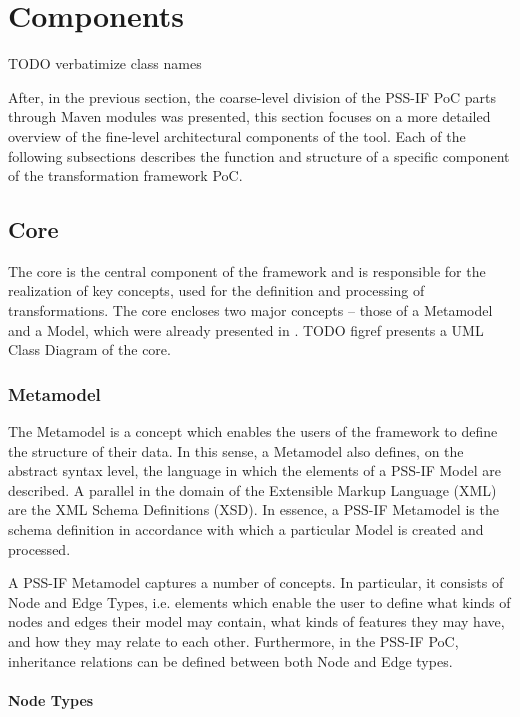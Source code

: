 \section{Components}
\label{sec:impl:components}

\color{red} TODO verbatimize class names \color{black}

After, in the previous section, the coarse-level division of the PSS-IF PoC parts through Maven modules was presented, this section focuses on a more detailed overview of the fine-level architectural components of the tool. Each of the following subsections describes the function and structure of a specific component of the transformation framework PoC.

\subsection{Core}

The core is the central component of the framework and is responsible for the realization of key concepts, used for the definition and processing of transformations. The core encloses two major concepts -- those of a Metamodel and a Model, which were already presented in . \color{red}TODO figref\color{black} presents a UML Class Diagram of the core.

\subsubsection{Metamodel}

The Metamodel is a concept which enables the users of the framework to define the structure of their data. In this sense, a Metamodel also defines, on the abstract syntax level, the language in which the elements of a PSS-IF Model are described. A parallel in the domain of the Extensible Markup Language (XML) are the XML Schema Definitions (XSD). In essence, a PSS-IF Metamodel is the schema definition in accordance with which a particular Model is created and processed.

A PSS-IF Metamodel captures a number of concepts. In particular, it consists of Node and Edge Types, i.e. elements which enable the user to define what kinds of nodes and edges their model may contain, what kinds of features they may have, and how they may relate to each other. Furthermore, in the PSS-IF PoC, inheritance relations can be defined between both Node and Edge types.

\paragraph{Node Types}

